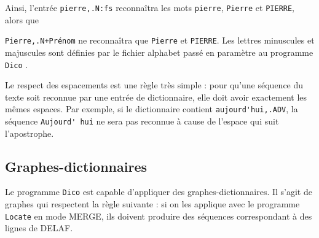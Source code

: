 \bigskip
\noindent Ainsi, l’entrée \verb$pierre,.N:fs$ reconnaîtra les mots \verb+pierre+,
\verb+Pierre+ et \verb+PIERRE+, alors que

\noindent \verb$Pierre,.N+Prénom$ ne reconnaîtra que \verb+Pierre+ et \verb+PIERRE+. Les lettres
minuscules et majuscules sont définies par le fichier alphabet passé en paramètre au programme
\verb+Dico+
.

\bigskip
\noindent Le respect des espacements est une règle très simple : pour qu’une séquence du texte
soit reconnue par une entrée de dictionnaire, elle doit avoir exactement les mêmes espaces.
Par exemple, si le dictionnaire contient \verb+aujourd'hui,.ADV+, la séquence \verb+Aujourd' hui+
ne sera pas reconnue à cause de l’espace qui suit l’apostrophe.


\subsection{Graphes-dictionnaires}
\label{section-dictionary-graphs}
Le programme \verb+Dico+ est capable
d’appliquer des graphes-dictionnaires. Il s’agit de graphes qui respectent la règle suivante :
si on les applique avec le programme \verb+Locate+ en mode MERGE, ils doivent produire des séquences
correspondant à des lignes de DELAF.

